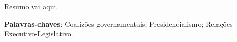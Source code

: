\begin{resumo}
Resumo vai aqui.

\vspace{\onelineskip}
\noindent
\textbf{Palavras-chaves}: Coalizões governamentais;  Presidencialismo; Relações Executivo-Legislativo.
\end{resumo}